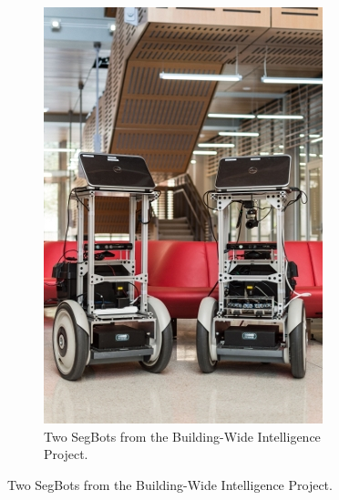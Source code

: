 \begin{figure}[t!]
	\centering
	\begin{subfigure}[t]{1.4in}
		\centering
        \includegraphics[width=\textwidth]{images/bwi3.png}
		\caption{Two SegBots from the Building-Wide Intelligence Project.}\label{fig:1a}		
	\end{subfigure}

\end{figure}
